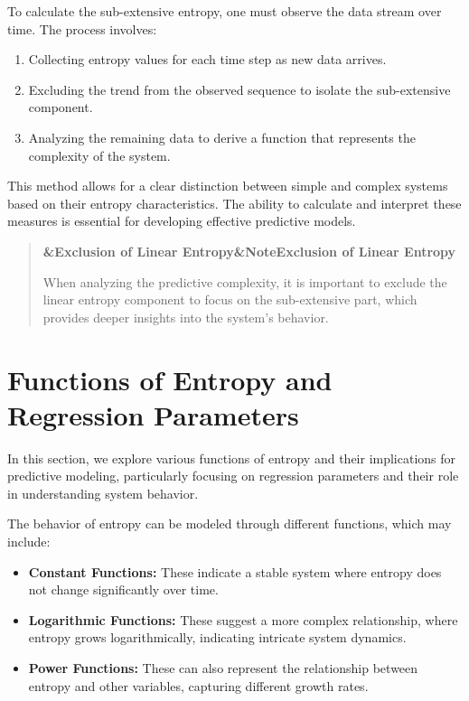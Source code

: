 \documentclass[a4paper]{article}
\newcommand{\boxheading}[1]{%
  \par\smallskip
  \noindent\textbf{\ifx&#1&Note\else#1\fi}\par
  \smallskip
}
\newenvironment{rembox}[1][]{%
  \begin{quote}\color{black!70}\boxheading{#1}\normalcolor
}{\end{quote}}
\begin{document}
To calculate the sub-extensive entropy, one must observe the data stream over time. The process involves:

\begin{enumerate}
    \item Collecting entropy values for each time step as new data arrives.
    \item Excluding the trend from the observed sequence to isolate the sub-extensive component.
    \item Analyzing the remaining data to derive a function that represents the complexity of the system.
\end{enumerate}

This method allows for a clear distinction between simple and complex systems based on their entropy characteristics. The ability to calculate and interpret these measures is essential for developing effective predictive models.

\begin{rembox}[Exclusion of Linear Entropy]
When analyzing the predictive complexity, it is important to exclude the linear entropy component to focus on the sub-extensive part, which provides deeper insights into the system's behavior.
\end{rembox}

\section{Functions of Entropy and Regression Parameters}
In this section, we explore various functions of entropy and their implications for predictive modeling, particularly focusing on regression parameters and their role in understanding system behavior.

The behavior of entropy can be modeled through different functions, which may include:

\begin{itemize}
    \item \textbf{Constant Functions:} These indicate a stable system where entropy does not change significantly over time.
    \item \textbf{Logarithmic Functions:} These suggest a more complex relationship, where entropy grows logarithmically, indicating intricate system dynamics.
    \item \textbf{Power Functions:} These can also represent the relationship between entropy and other variables, capturing different growth rates.
\end{itemize}
\end{document}
